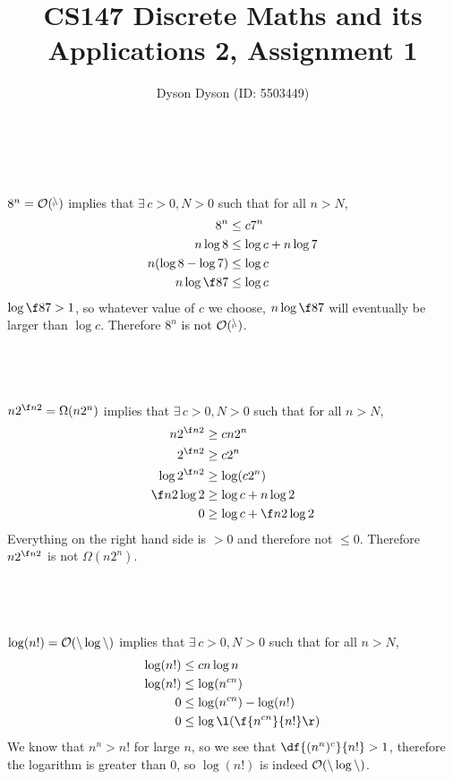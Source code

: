 \documentclass[a4paper]{article}
\title{CS147 Discrete Maths and its Applications 2, Assignment 1}
\author{Dyson Dyson (ID: 5503449)}
\begin{document}
\maketitle

\setlength{\parindent}{0em}
\setlength{\parskip}{1em}


\subsection{~}

$8^n = \cal O(7^n)$ implies that $\exists\, c > 0, N > 0$ such that for all $n > N$, \begin{align*}
8^n &\le c 7^n\\
n \log 8 &\le \log c + n \log 7\\
n (\log 8 - \log 7) &\le \log c\\
n \log \f87 &\le \log c
\end{align*}
$\log \f87 > 1$, so whatever value of $c$ we choose, $n \log \f87$ will eventually be larger than $\log c$. Therefore $8^n$ is not $\cal O(7^n)$.

\subsection{~}

$n 2^{\f n2} = \Omega(n 2^n)$ implies that $\exists\, c > 0, N > 0$ such that for all $n > N$, \begin{align*}
n 2^{\f n2} &\ge c n 2^n\\
2^{\f n2} &\ge c 2^n\\
\log 2^{\f n2} &\ge \log (c 2^n)\\
\f n2 \log 2 &\ge \log c + n \log 2\\
0 &\ge \log c + \f n2 \log 2
\end{align*}
Everything on the right hand side is $>0$ and therefore not $\le 0$. Therefore $n 2^{\f n2}$ is not $\Omega(n 2^n)$.

\subsection{~}

$\log (n!) = \cal O(n \log n)$ implies that $\exists\, c > 0, N > 0$ such that for all $n > N$, \begin{align*}
\log (n!) &\le c n \log n\\
\log (n!) &\le \log(n^{cn})\\
0 &\le \log(n^{cn}) - \log(n!)\\
0 &\le \log\l(\f{n^{cn}}{n!}\r)
\end{align*}
We know that $n^n > n!$ for large $n$, so we see that $\df{(n^n)^c}{n!} > 1$, therefore the logarithm is greater than $0$, so $\log(n!)$ is indeed $\cal O(n \log n)$.
\end{document}
